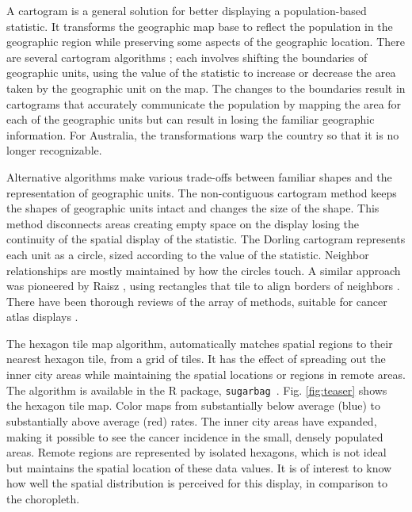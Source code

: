 \documentclass[journal]{vgtc}                     %
\begin{document}
A cartogram is a general solution for better displaying a population-based statistic. It transforms the geographic map base to reflect the population in the geographic region while preserving some aspects of the geographic location. There are several cartogram algorithms \cite{ACTUC,CBATCC}; each involves shifting the boundaries of geographic units, using the value of the statistic to increase or decrease the area taken by the geographic unit on the map. The changes to the boundaries result in cartograms that accurately communicate the population by mapping the area for each of the geographic units but can result in losing the familiar geographic information. For Australia, the transformations warp the country so that it is no longer recognizable.

Alternative algorithms make various trade-offs between familiar shapes and the representation of geographic units. The non-contiguous cartogram method \cite{NAC} keeps the shapes of geographic units intact and changes the size of the shape. This method disconnects areas creating empty space on the display losing the continuity of the spatial display of the statistic. The Dorling cartogram \cite{ACTUC} represents each unit as a circle, sized according to the value of the statistic. Neighbor relationships are mostly maintained by how the circles touch. A similar approach was pioneered by Raisz \cite{RSCW}, using rectangles that tile to align borders of neighbors \cite{CDWCS}. There have been thorough reviews of the array of methods, suitable for cancer atlas displays \cite{review,BCM}.





The hexagon tile map algorithm, automatically matches spatial regions to their nearest hexagon tile, from a grid of tiles. It has the effect of spreading out the inner city areas while maintaining the spatial locations or regions in remote areas. The algorithm is available in the R package, \texttt{sugarbag}~\cite{sugarbag}. Fig. \ref{fig:teaser} shows the hexagon tile map. Color maps from substantially below average (blue) to substantially above average (red) rates. The inner city areas have expanded, making it possible to see the cancer incidence in the small, densely populated areas. Remote regions are represented by isolated hexagons, which is not ideal but maintains the spatial location of these data values. It is of interest to know how well the spatial distribution is perceived for this display, in comparison to the choropleth.
\end{document}
